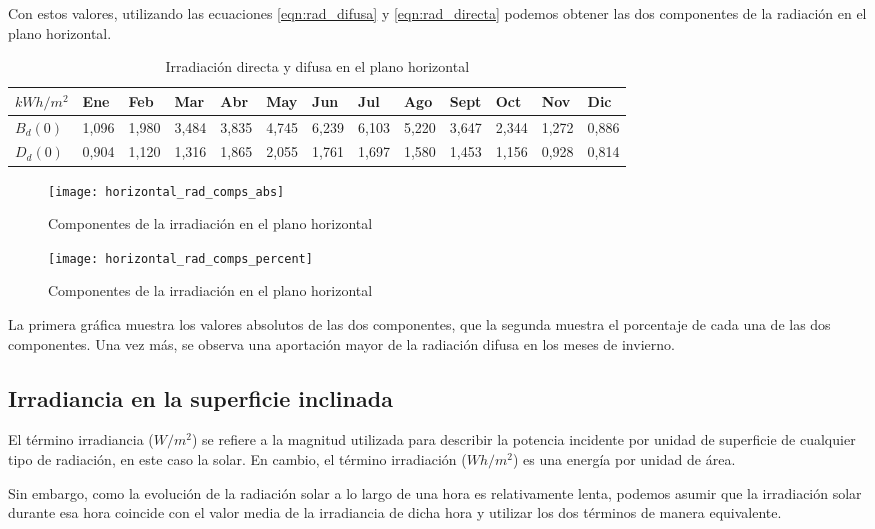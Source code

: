 Con estos valores, utilizando las ecuaciones \ref{eqn:rad_difusa} y \ref{eqn:rad_directa} podemos obtener las dos componentes de la radiación en el plano horizontal.

\begin{table}[ht]
\centering
\begin{tabular}{|l|l|l|l|l|l|l|l|l|l|l|l|l|}
\hline
$kWh/m^2$  & Ene   & Feb   & Mar   & Abr   & May   & Jun   & Jul   & Ago   & Sept  & Oct   & Nov    & Dic    \\ \hline
$B_{d}(0)$ & 1,096 & 1,980 & 3,484 & 3,835 & 4,745 & 6,239 & 6,103 & 5,220 & 3,647 & 2,344 & 1,272  & 0,886  \\ \hline
$D_{d}(0)$ & 0,904 & 1,120 & 1,316 & 1,865 & 2,055 & 1,761 & 1,697 & 1,580 & 1,453 & 1,156 & 0,928  & 0,814  \\ \hline
\end{tabular}
\label{tab:rad_components}
\caption{Irradiación directa y difusa en el plano horizontal}
\end{table}

\begin{figure}[H]
\texttt{[image: horizontal\_rad\_comps\_abs]}
\centering
\caption{Componentes de la irradiación en el plano horizontal}
\label{fig:rad_components_abs}
\end{figure}

\begin{figure}[H]
\texttt{[image: horizontal\_rad\_comps\_percent]}
\centering
\caption{Componentes de la irradiación en el plano horizontal}
\label{fig:rad_components_percent}
\end{figure}

La primera gráfica muestra los valores absolutos de las dos componentes, que la segunda muestra el porcentaje de cada una de las dos componentes. Una vez más, se observa una aportación mayor de la radiación difusa en los meses de invierno.

\subsection{Irradiancia en la superficie inclinada}

El término irradiancia ($W/m^2$) se refiere a la magnitud utilizada para describir la potencia incidente por unidad de superficie de cualquier tipo de radiación, en este caso la solar. En cambio, el término irradiación ($Wh/m^2$) es una energía por unidad de área. 

Sin embargo, como la evolución de la radiación solar a lo largo de una hora es relativamente lenta, podemos asumir que la irradiación solar durante esa hora coincide con el valor media de la irradiancia de dicha hora y utilizar los dos términos de manera equivalente.


